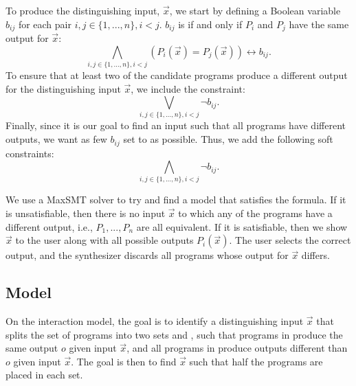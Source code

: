 To produce the distinguishing input, \(\vec{x}\), we start by defining a Boolean variable \(b_{ij}\) for each pair \(i,j\in\{1, ..., n\},i<j\). \(b_{ij}\) is \true if and only if \(P_i\) and \(P_j\) have the same output for \(\vec{x}\):
%
\begin{equation}
    \bigwedge_{i,j \in \{1, ..., n\}, i < j} (P_i(\vec{x}) = P_j(\vec{x})) \leftrightarrow b_{ij}.
\end{equation}
%
To ensure that at least two of the candidate programs produce a different output for the distinguishing input \(\vec{x}\), we include the constraint:
%
\begin{equation}
    \bigvee_{i,j \in \{1, ..., n\}, i < j} \neg b_{ij}.
\end{equation}
%
Finally, since it is our goal to find an input such that all programs have different outputs, we want as few \(b_{ij}\) set to \true as possible.
Thus, we add the following soft constraints:
%
\begin{equation}
    \bigwedge_{i,j \in \{1, ..., n\}, i < j} \neg b_{ij}.
\end{equation}

We use a \ac{MaxSMT} solver to try and find a model that satisfies the formula. If it is unsatisfiable, then there is no input \(\vec{x}\) to which any of the programs have a different output, i.e., \(P_1, ..., P_n\) are all equivalent. If it is satisfiable, then we show \(\vec{x}\) to the user along with all possible outputs \(P_i(\vec{x})\). The user selects the correct output, and the synthesizer discards all programs whose output for \(\vec{x}\) differs.

\subsection{\ynmodel Model}

On the \ynmodel interaction model, the goal is to identify a distinguishing input \(\vec{x}\) that splits the set of programs into two sets  and , such that programs in  produce the same output \(o\)  given input \(\vec{x}\), and all programs in  produce outputs different than \(o\) given input \(\vec{x}\).
%
The goal is then to find \(\vec{x}\) such that half the programs are placed in each set.

